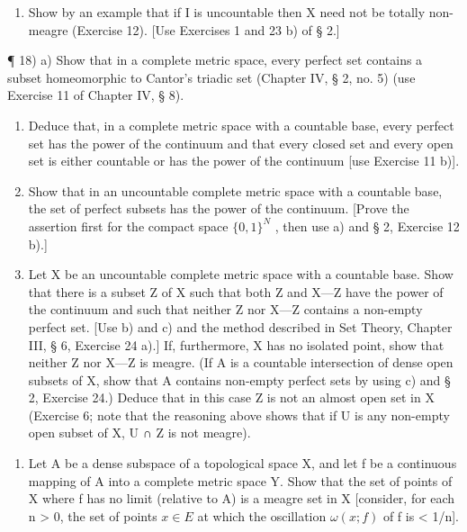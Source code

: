 \begin{enumerate}
\def\labelenumi{\alph{enumi})}
\setcounter{enumi}{1}
\tightlist
\item
  Show by an example that if I is uncountable then X need not be totally non-meagre (Exercise 12). {[}Use Exercises 1 and 23 b) of § 2.{]}
\end{enumerate}

¶ 18) a) Show that in a complete metric space, every perfect set contains a subset homeomorphic to Cantor's triadic set (Chapter IV, § 2, no. 5) (use Exercise 11 of Chapter IV, § 8).

\begin{enumerate}
\def\labelenumi{\alph{enumi})}
\setcounter{enumi}{1}
\item
  Deduce that, in a complete metric space with a countable base, every perfect set has the power of the continuum and that every closed set and every open set is either countable or has the power of the continuum {[}use Exercise 11 b){]}.
\item
  Show that in an uncountable complete metric space with a countable base, the set of perfect subsets has the power of the continuum. {[}Prove the assertion first for the compact space \(\{0, 1\}^{N}\) , then use a) and § 2, Exercise 12 b).{]}
\item
  Let X be an uncountable complete metric space with a countable base. Show that there is a subset Z of X such that both Z and X---Z have the power of the continuum and such that neither Z nor X---Z contains a non-empty perfect set. {[}Use b) and c) and the method described in Set Theory, Chapter III, § 6, Exercise 24 a).{]} If, furthermore, X has no isolated point, show that neither Z nor X---Z is meagre. (If A is a countable intersection of dense open subsets of X, show that A contains non-empty perfect sets by using c) and § 2, Exercise 24.) Deduce that in this case Z is not an almost open set in X (Exercise 6; note that the reasoning above shows that if U is any non-empty open subset of X, U ∩ Z is not meagre).
\end{enumerate}

\begin{enumerate}
\def\labelenumi{\arabic{enumi})}
\setcounter{enumi}{18}
\tightlist
\item
  Let A be a dense subspace of a topological space X, and let f be a continuous mapping of A into a complete metric space Y. Show that the set of points of X where f has no limit (relative to A) is a meagre set in X {[}consider, for each n \textgreater{} 0, the set of points \(x \in E\) at which the oscillation \(\omega(x; f)\) of f is \textless{} 1/n{]}.
\end{enumerate}

